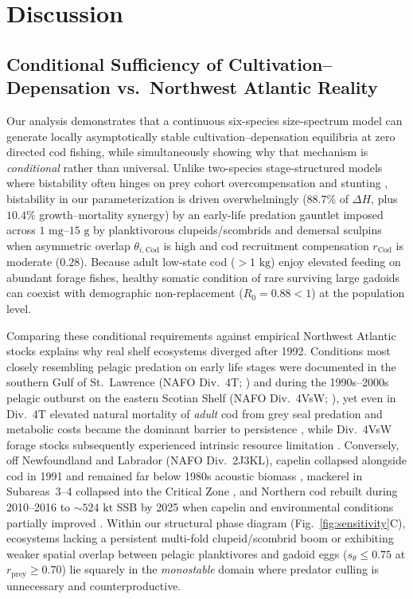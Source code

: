 \documentclass[11pt,letterpaper]{article}
\begin{document}
\section{Discussion}
\label{sec:discussion}

\subsection{Conditional Sufficiency of Cultivation--Depensation vs.\ Northwest Atlantic Reality}

Our analysis demonstrates that a continuous six-species size-spectrum model can generate locally asymptotically stable cultivation--depensation equilibria at zero directed cod fishing, while simultaneously showing why that mechanism is \emph{conditional} rather than universal. Unlike two-species stage-structured models where bistability often hinges on prey cohort overcompensation and stunting \citep{vanleeuwen2008how,gardmark2015regime}, bistability in our parameterization is driven overwhelmingly ($88.7\%$ of $\Delta H$, plus $10.4\%$ growth--mortality synergy) by an early-life predation gauntlet imposed across $1\text{ mg}$--$15\text{ g}$ by planktivorous clupeids/scombrids and demersal sculpins when asymmetric overlap $\theta_{i,\mathrm{Cod}}$ is high and cod recruitment compensation $r_{\mathrm{Cod}}$ is moderate ($0.28$). Because adult low-state cod ($> 1\text{ kg}$) enjoy elevated feeding on abundant forage fishes, healthy somatic condition of rare surviving large gadoids can coexist with demographic non-replacement ($R_0 = 0.88 < 1$) at the population level.

Comparing these conditional requirements against empirical Northwest Atlantic stocks explains why real shelf ecosystems diverged after 1992. Conditions most closely resembling pelagic predation on early life stages were documented in the southern Gulf of St.~Lawrence (NAFO Div.~4T; \citealt{swain2000pelagic}) and during the 1990s--2000s pelagic outburst on the eastern Scotian Shelf (NAFO Div.~4VsW; \citealt{frank2005trophic,bundy2005can}), yet even in Div.~4T elevated natural mortality of \emph{adult} cod from grey seal predation and metabolic costs became the dominant barrier to persistence \citep{swain2008predicted,shelton2006fishing}, while Div.~4VsW forage stocks subsequently experienced intrinsic resource limitation \citep{frank2011transient}. Conversely, off Newfoundland and Labrador (NAFO Div.~2J3KL), capelin collapsed alongside cod in 1991 and remained far below 1980s acoustic biomass \citep{dfo2025capelin}, mackerel in Subareas~3--4 collapsed into the Critical Zone \citep{dfo2026mackerel}, and Northern cod rebuilt during 2010--2016 to $\sim 524\text{ kt}$ SSB by 2025 when capelin and environmental conditions partially improved \citep{rose2002capelin,lilly2013review,dfo2025cod}. Within our structural phase diagram (Fig.~\ref{fig:sensitivity}C), ecosystems lacking a persistent multi-fold clupeid/scombrid boom or exhibiting weaker spatial overlap between pelagic planktivores and gadoid eggs ($s_\theta \le 0.75$ at $r_{\mathrm{prey}} \ge 0.70$) lie squarely in the \emph{monostable} domain where predator culling is unnecessary and counterproductive.
\end{document}

